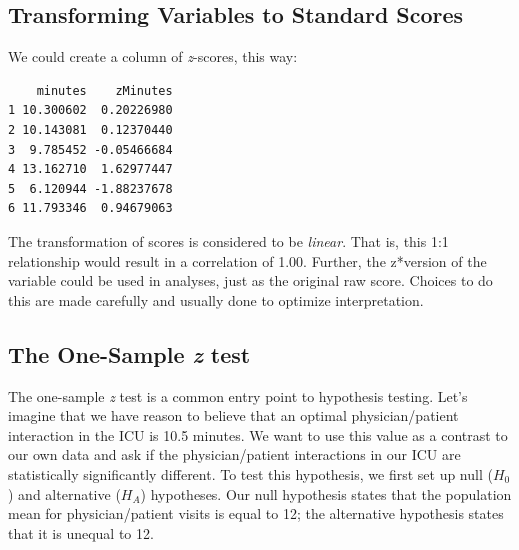 \documentclass[
  11pt,
]{book}
\newenvironment{Shaded}{\begin{snugshade}}{\end{snugshade}}
\newcommand{\FunctionTok}[1]{\textcolor[rgb]{0.00,0.00,0.00}{#1}}
\newcommand{\NormalTok}[1]{#1}
\newcommand{\OtherTok}[1]{\textcolor[rgb]{0.56,0.35,0.01}{#1}}
\newcommand{\SpecialCharTok}[1]{\textcolor[rgb]{0.00,0.00,0.00}{#1}}
\begin{document}
\hypertarget{transforming-variables-to-standard-scores}{%
\subsection{Transforming Variables to Standard Scores}\label{transforming-variables-to-standard-scores}}

We could create a column of \emph{z}-scores, this way:

\begin{Shaded}
\end{Shaded}

\begin{verbatim}
    minutes    zMinutes
1 10.300602  0.20226980
2 10.143081  0.12370440
3  9.785452 -0.05466684
4 13.162710  1.62977447
5  6.120944 -1.88237678
6 11.793346  0.94679063
\end{verbatim}

The transformation of scores is considered to be \emph{linear}. That is, this 1:1 relationship would result in a correlation of 1.00. Further, the z*version of the variable could be used in analyses, just as the original raw score. Choices to do this are made carefully and usually done to optimize interpretation.

\hypertarget{the-one-sample-z-test}{%
\subsection{\texorpdfstring{The One-Sample \emph{z} test}{The One-Sample z test}}\label{the-one-sample-z-test}}

The one-sample \emph{z} test is a common entry point to hypothesis testing. Let's imagine that we have reason to believe that an optimal physician/patient interaction in the ICU is 10.5 minutes. We want to use this value as a contrast to our own data and ask if the physician/patient interactions in our ICU are statistically significantly different. To test this hypothesis, we first set up null (\(H_0\)) and alternative (\(H_A\)) hypotheses. Our null hypothesis states that the population mean for physician/patient visits is equal to 12; the alternative hypothesis states that it is unequal to 12.
\end{document}
